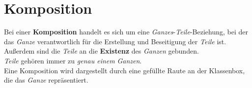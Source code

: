 \section{Komposition}

\begin{tcolorbox}[title=Komposition]
    Bei einer \textbf{Komposition} handelt es sich um eine \textit{Ganzes}-\textit{Teile}-Beziehung, bei der das \textit{Ganze} verantwortlich für die Erstellung und Beseitigung der \textit{Teile} ist.
    Außerdem sind die \textit{Teile} an die \textbf{Existenz} des \textit{Ganzen} gebunden.\\
    \textit{Teile} gehören immer zu \textit{genau einem} \textit{Ganzen}.\\
    Eine Komposition wird dargestellt durch eine gefüllte Raute an der Klassenbox, die das \textit{Ganze} repräsentiert.
\end{tcolorbox}